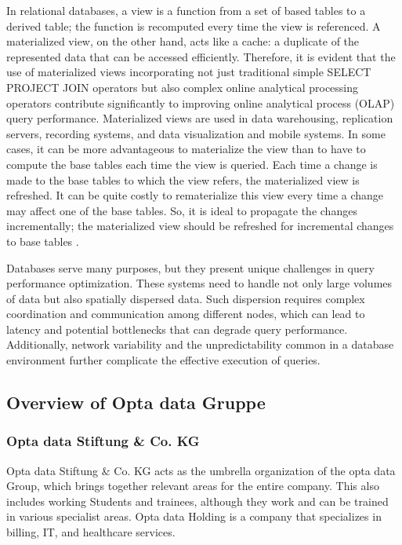 In relational databases, a view is a function from a set of based tables to a derived table; the function is recomputed every time the view is referenced. A materialized view, on the other hand, acts like a cache: a duplicate of the represented data that can be accessed efficiently. Therefore, it is evident that the use of materialized views incorporating not just traditional simple SELECT PROJECT JOIN operators but also complex online analytical processing operators contribute significantly to improving online analytical process (OLAP) query performance. Materialized views are used in data warehousing, replication servers, recording systems, and data visualization and mobile systems. In some cases, it can be more advantageous to materialize the view than to have to compute the base tables each time the view is queried. Each time a change is made to the base tables to which the view refers, the materialized view is refreshed. It can be quite costly to rematerialize this view every time a change may affect one of the base tables. So, it is ideal to propagate the changes incrementally; the materialized view should be refreshed for incremental changes to base tables \cite{Data_warehousing,efficient_incremental,rashid2009role}.\vspace{.4cm}

Databases serve many purposes, but they present unique challenges in query performance optimization. These systems need to handle not only large volumes of data but also spatially dispersed data. Such dispersion requires complex coordination and communication among different nodes, which can lead to latency and potential bottlenecks that can degrade query performance. Additionally, network variability and the unpredictability common in a database environment further complicate the effective execution of queries.

\subsection{Overview of Opta data Gruppe}
\subsubsection{Opta data Stiftung \& Co. KG }
Opta data Stiftung \& Co. KG acts as the umbrella organization of the opta data Group, which brings together relevant areas for the entire company. This also includes working Students and trainees, although they work and can be trained in various specialist areas. Opta data Holding is a company that specializes in billing, IT, and healthcare services.

